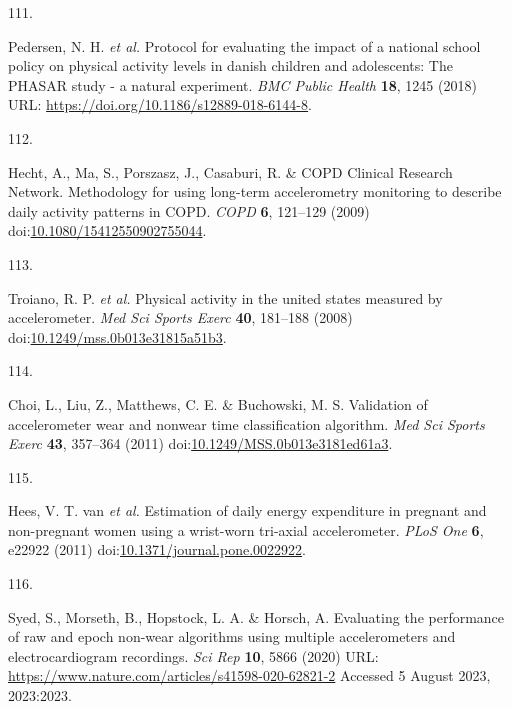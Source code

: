 \documentclass[
  9pt,
]{scrbook}
\newlength{\cslhangindent}
\newlength{\csllabelwidth}
\newlength{\cslentryspacingunit} %
\newenvironment{CSLReferences}[2] %
 {%
  \setlength{\parindent}{0pt}
  \ifodd #1
  \let\oldpar\par
  \def\par{\hangindent=\cslhangindent\oldpar}
  \fi
  \setlength{\parskip}{#2\cslentryspacingunit}
 }%
 {}
\newcommand{\CSLLeftMargin}[1]{\parbox[t]{\csllabelwidth}{#1}}
\newcommand{\CSLRightInline}[1]{\parbox[t]{\linewidth - \csllabelwidth}{#1}\break}
\begin{document}
\begin{CSLReferences}{0}{0}
\leavevmode{}%
\CSLLeftMargin{111. }%
\CSLRightInline{Pedersen, N. H. \emph{et al.} Protocol for evaluating
the impact of a national school policy on physical activity levels in
danish children and adolescents: The PHASAR study - a natural
experiment. \emph{BMC Public Health} \textbf{18}, 1245 (2018) URL:
\url{https://doi.org/10.1186/s12889-018-6144-8}.}

\leavevmode{}%
\CSLLeftMargin{112. }%
\CSLRightInline{Hecht, A., Ma, S., Porszasz, J., Casaburi, R. \& COPD
Clinical Research Network. Methodology for using long-term accelerometry
monitoring to describe daily activity patterns in {COPD}. \emph{{COPD}}
\textbf{6}, 121--129 (2009)
doi:\href{https://doi.org/10.1080/15412550902755044}{10.1080/15412550902755044}.}

\leavevmode{}%
\CSLLeftMargin{113. }%
\CSLRightInline{Troiano, R. P. \emph{et al.} Physical activity in the
united states measured by accelerometer. \emph{Med Sci Sports Exerc}
\textbf{40}, 181--188 (2008)
doi:\href{https://doi.org/10.1249/mss.0b013e31815a51b3}{10.1249/mss.0b013e31815a51b3}.}

\leavevmode{}%
\CSLLeftMargin{114. }%
\CSLRightInline{Choi, L., Liu, Z., Matthews, C. E. \& Buchowski, M. S.
Validation of accelerometer wear and nonwear time classification
algorithm. \emph{Med Sci Sports Exerc} \textbf{43}, 357--364 (2011)
doi:\href{https://doi.org/10.1249/MSS.0b013e3181ed61a3}{10.1249/MSS.0b013e3181ed61a3}.}

\leavevmode{}%
\CSLLeftMargin{115. }%
\CSLRightInline{Hees, V. T. van \emph{et al.} Estimation of daily energy
expenditure in pregnant and non-pregnant women using a wrist-worn
tri-axial accelerometer. \emph{{PLoS} One} \textbf{6}, e22922 (2011)
doi:\href{https://doi.org/10.1371/journal.pone.0022922}{10.1371/journal.pone.0022922}.}

\leavevmode{}%
\CSLLeftMargin{116. }%
\CSLRightInline{Syed, S., Morseth, B., Hopstock, L. A. \& Horsch, A.
Evaluating the performance of raw and epoch non-wear algorithms using
multiple accelerometers and electrocardiogram recordings. \emph{Sci Rep}
\textbf{10}, 5866 (2020) URL:
\url{https://www.nature.com/articles/s41598-020-62821-2} Accessed 5
August 2023, 2023:2023.}


\end{CSLReferences}
\end{document}
